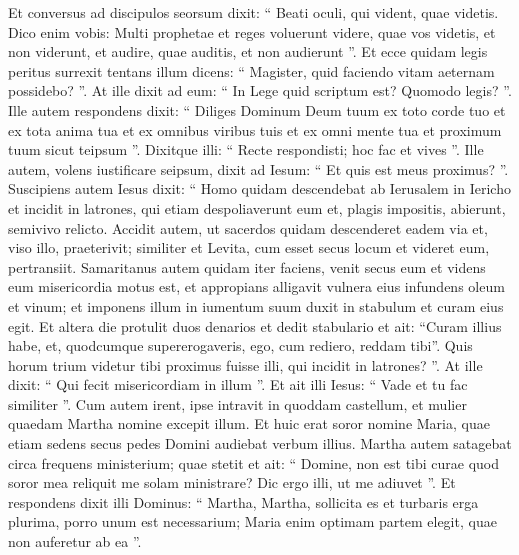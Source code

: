 \begin{biblechapter}
\begin{biblechapter}
\begin{biblechapter}
\begin{biblechapter}
\begin{biblechapter}
\begin{biblechapter}
\begin{biblechapter}
\begin{biblechapter}
\begin{biblechapter}
\begin{biblechapter}
 \verse Et conversus ad discipulos seorsum dixit: “ Beati oculi, qui vident, quae videtis. 
\verse Dico enim vobis: Multi prophetae et reges voluerunt videre, quae vos videtis, et non viderunt, et audire, quae auditis, et non audierunt ”.
 \verse Et ecce quidam legis peritus surrexit tentans illum dicens: “ Magister, quid faciendo vitam aeternam possidebo? ”. 
\verse At ille dixit ad eum: “ In Lege quid scriptum est? Quomodo legis? ”. 
\verse Ille autem respondens dixit: “ Diliges Dominum Deum tuum ex toto corde tuo et ex tota anima tua et ex omnibus viribus tuis et ex omni mente tua et proximum tuum sicut teipsum ”. 
\verse Dixitque illi: “ Recte respondisti; hoc fac et vives ”. 
\verse Ille autem, volens iustificare seipsum, dixit ad Iesum: “ Et quis est meus proximus? ”.
 \verse Suscipiens autem Iesus dixit: “ Homo quidam descendebat ab Ierusalem in Iericho et incidit in latrones, qui etiam despoliaverunt eum et, plagis impositis, abierunt, semivivo relicto. 
\verse Accidit autem, ut sacerdos quidam descenderet eadem via et, viso illo, praeterivit; 
\verse similiter et Levita, cum esset secus locum et videret eum, pertransiit. 
\verse Samaritanus autem quidam iter faciens, venit secus eum et videns eum misericordia motus est, 
 \verse et appropians alligavit vulnera eius infundens oleum et vinum; et imponens illum in iumentum suum duxit in stabulum et curam eius egit. 
\verse Et altera die protulit duos denarios et dedit stabulario et ait: “Curam illius habe, et, quodcumque supererogaveris, ego, cum rediero, reddam tibi”. 
\verse Quis horum trium videtur tibi proximus fuisse illi, qui incidit in latrones? ”. 
\verse At ille dixit: “ Qui fecit misericordiam in illum ”. Et ait illi Iesus: “ Vade et tu fac similiter ”.
 \verse Cum autem irent, ipse intravit in quoddam castellum, et mulier quaedam Martha nomine excepit illum. 
\verse Et huic erat soror nomine Maria, quae etiam sedens secus pedes Domini audiebat verbum illius. 
\verse Martha autem satagebat circa frequens ministerium; quae stetit et ait: “ Domine, non est tibi curae quod soror mea reliquit me solam ministrare? Dic ergo illi, ut me adiuvet ”. 
\verse Et respondens dixit illi Dominus: “ Martha, Martha, sollicita es et turbaris erga plurima, 
\verse porro unum est necessarium; Maria enim optimam partem elegit, quae non auferetur ab ea ”.
 

\end{biblechapter}
\end{biblechapter}
\end{biblechapter}
\end{biblechapter}
\end{biblechapter}
\end{biblechapter}
\end{biblechapter}
\end{biblechapter}
\end{biblechapter}
\end{biblechapter}
